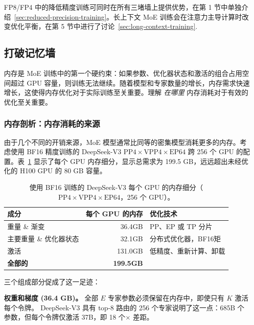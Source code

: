 FP8/FP4 中的降低精度训练可同时在所有三堵墙上提供优势，在第 1 节中单独介绍~\ref{sec:reduced-precision-training}。长上下文 MoE 训练会在注意力主导计算时改变优化平衡，在第 5 节中进行了讨论~\ref{sec:long-context-training}.

\subsection{打破记忆墙}\label{sec:memory-wall}

内存是 MoE 训练中的第一个硬约束：如果参数、优化器状态和激活的组合占用空间超过 GPU 容量，则训练无法继续。随着模型和专家数量的增长，内存需求快速增长，这使得内存优化对于实际训练至关重要。理解 \emph{在哪里} 内存消耗对于有效的优化至关重要。

\subsubsection{内存剖析：内存消耗的来源}

由于几个不同的开销来源，MoE 模型通常比同等的密集模型消耗更多的内存。考虑使用 BF16 精度训练的 DeepSeek-V3 $\text{PP}4 \times \text{VPP}4 \times \text{EP}64$ 跨 256 个 GPU 的配置。表~\ref{tab:memory-breakdown} 显示了每个 GPU 内存细分，显示总需求为 199.5 GB，远远超出未经优化的 H100 GPU 的 80 GB 容量。

\begin{table}[ht]
\centering
\caption{使用 BF16 训练的 DeepSeek-V3 每个 GPU 的内存细分（$\text{PP}4 \times \text{VPP}4 \times \text{EP}64$，256 个 GPU）。}
\label{tab:memory-breakdown}
\begin{tabular}{lrl}
\toprule
\textbf{成分} & \textbf{每个 GPU 的内存} & \textbf{优化技术} \\
\midrule
重量 \& 渐变 & 36.4GB & PP、EP 或 TP 分片 \\
主要重量 \& 优化器状态 & 32.1GB & 分布式优化器，BF16矩 \\
激活 & 131.0GB & 低精度、重新计算、卸载 \\
\midrule
\textbf{全部的} & \textbf{199.5GB} & \\
\bottomrule
\end{tabular}
\end{table}

三个组成部分促成了这一足迹：

\textbf{权重和梯度 (36.4 GB)。} 全部 $E$ 专家参数必须保留在内存中，即使只有 $K$ 激活每个令牌。 DeepSeek-V3 具有 top-8 路由的 256 个专家说明了这一点：685B 个参数，但每个令牌仅激活 37B，即 18 个$\times$ 差距。

